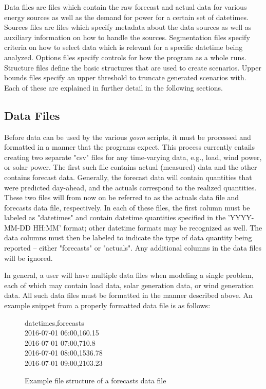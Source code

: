 \documentclass[11pt]{article}
\begin{document}
Data files are files which contain the raw forecast and actual data for various energy sources as well as the demand for power for a certain set of datetimes.
Sources files are files which specify metadata about the data sources as well as auxiliary information on how to handle the sources.
Segmentation files specify criteria on how to select data which is relevant for a specific datetime being analyzed.
Options files specify controls for how the program as a whole runs.
Structure files define the basic structures that are used to create scenarios. Upper bounds files specify an upper threshold to truncate generated scenarios with.
Each of these are explained in further detail in the following sections.

\subsection{Data Files}
Before data can be used by the various \textit{gosm} scripts, it must be processed and formatted in a manner that the programs expect. This process currently entails creating two separate "csv" files for any time-varying data, e.g., load, wind power, or solar power. The first such file contains actual (measured) data and the other contains forecast data. Generally, the forecast data will contain quantities that were predicted day-ahead, and the actuals correspond to the realized quantities. These two files will from now on be referred to as the actuals data file and forecasts data file, respectively. In each of these files, the first column must be labeled as "datetimes" and contain datetime quantities specified in the 'YYYY-MM-DD HH:MM' format; other datetime formats may be recognized as well. The data columns must then be labeled to indicate the type of data quantity being reported -- either "forecasts" or "actuals". Any additional columns in the data files will be ignored.

In general, a user will have multiple data files when modeling a single problem, each of which may contain load data, solar generation data, or wind generation data. All such data files must be formatted in the manner described above. An example snippet from a properly formatted data file is as follows:
\begin{figure}[H]
	\begin{framed}
		\noindent
		datetimes,forecasts\\
		2016-07-01 06:00,160.15\\
		2016-07-01 07:00,710.8\\
		2016-07-01 08:00,1536.78\\
		2016-07-01 09:00,2103.23
	\end{framed}
	\caption{Example file structure of a forecasts data file}
	\label{fig:structure_data}
\end{figure}
\end{document}
